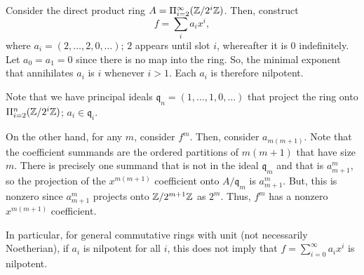 \begin{remark}
Consider the direct product ring $A = \Pi_{i=2}^{\infty}(\mathbb{Z} / 2^i \mathbb{Z})$. Then, construct 
$$f = \sum_i a_i x^i,$$
where $a_i = (2,\ldots,2,0,\ldots)$; $2$ appears until slot $i$, whereafter it is $0$ indefinitely. Let $a_0 = a_1 = 0$ since there is no map into the ring.
So, the minimal exponent that annihilates $a_i$ is $i$ whenever $i > 1$. Each $a_i$ is therefore nilpotent.

Note that we have principal ideals $\mathfrak{q}_n = (1,\ldots,1,0,\ldots)$ that project the ring onto $\Pi_{i=2}^n(\mathbb{Z} / 2^i \mathbb{Z})$; $a_i \in \mathfrak{q}_i$.

On the other hand, for any $m$, consider $f^m$. Then, consider $a_{m(m+1)}$. Note that the coefficient summands are the ordered partitions of 
$m(m+1)$ that have size $m$. There is precisely one summand that is not in the ideal $\mathfrak{q}_m$ and that is $a_{m+1}^m$, so the projection of the 
$x^{m(m+1)}$ coefficient onto $A/\mathfrak{q}_m$ is $a_{m+1}^m$. But, this is nonzero since $a_{m+1}^m$ projects onto $\mathbb{Z} / 2^{m+1} \mathbb{Z}$ as $2^m$. Thus,
$f^m$ has a nonzero $x^{m(m+1)}$ coefficient.

In particular, for general commutative rings with unit (not necessarily Noetherian), if $a_i$ is nilpotent for all $i$, this does not imply that
$f = \sum_{i=0}^{\infty}a_i x^i$ is nilpotent.
\end{remark}

